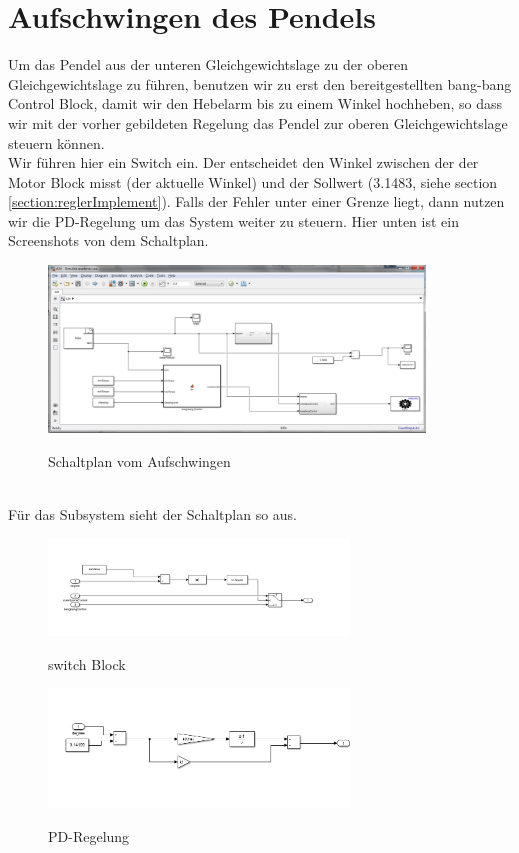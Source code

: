 \documentclass{article}
\begin{document}
\section{Aufschwingen des Pendels}
Um das Pendel aus der unteren Gleichgewichtslage zu der oberen Gleichgewichtslage zu führen,
benutzen wir zu erst den bereitgestellten bang-bang Control Block, damit wir den Hebelarm bis zu
einem Winkel hochheben, so dass wir mit der vorher gebildeten Regelung das Pendel zur oberen Gleichgewichtslage
steuern können. \\
Wir führen hier ein Switch ein. Der entscheidet den Winkel zwischen der der Motor Block misst (der aktuelle Winkel) und
der Sollwert (3.1483, siehe section \ref{section:reglerImplement}). Falls der Fehler unter einer Grenze liegt, dann nutzen wir die PD-Regelung
um das System weiter zu steuern. Hier unten ist ein Screenshots von dem Schaltplan.
\begin{figure}[h]
	\caption{Schaltplan vom Aufschwingen}
	\centering
	\includegraphics[width=10cm]{a24}
	\label{fig:schaltplan24}
\end{figure}\\
Für das Subsystem sieht der Schaltplan so aus.
\begin{figure}[h]
	\caption{switch Block}
	\centering
	\includegraphics[width=8cm]{a24switching}
	\label{fig:switch}
\end{figure}
\begin{figure}[h]
	\caption{PD-Regelung}
	\centering
	\includegraphics[width=8cm]{a24Sub1}
	\label{fig:pdRegelung}
\end{figure}
%
%
\end{document}
